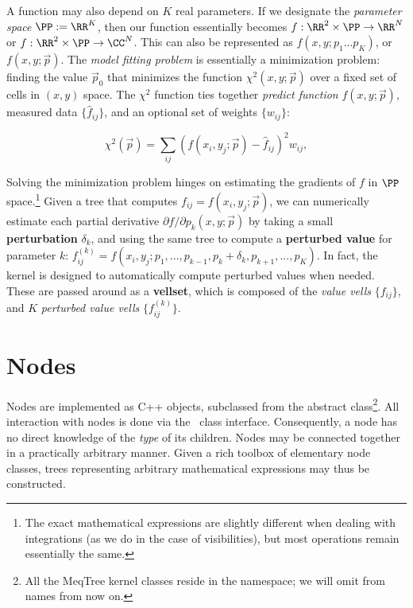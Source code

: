   A function may also depend on $K$ real parameters. If we designate the {\em
  parameter space} $\PP:=\RR^K$, then our function essentially becomes
  $f:\RR^2\times\PP\rightarrow\RR^N$ or $f:\RR^2\times\PP\rightarrow\CC^N$.
  This can also be represented as $f(x,y;p_1...p_K)$, or $f(x,y;\vec{p})$. The
  {\em model fitting problem} is essentially a minimization problem: finding
  the value $\vec{p}_0$  that minimizes the function $\chi^2(x,y;\vec{p})$ over
  a fixed set of cells in $(x,y)$ space. The $\chi^2$ function  ties together
  {\em predict function} $f(x,y;\vec{p})$, measured data $\{\hat{f}_{ij}\}$, and
  an optional set of weights $\{w_{ij}\}$:

  $$ \chi^2(\vec{p}) = \sum_{ij} (f(x_i,y_j;\vec{p}) - \hat{f}_{ij})^2w_{ij},$$
  
  Solving the minimization problem hinges on estimating the gradients of $f$ in
  $\PP$ space.\footnote{The exact mathematical expressions are slightly
  different when dealing with integrations (as we do in the case of
  visibilities), but most operations remain essentially the same.} Given a tree
  that computes $f_{ij}=f(x_i,y_j;\vec{p})$, we can numerically estimate each
  partial derivative ${\partial f}/{\partial p_k}(x,y;\vec{p})$ by taking a
  small {\bf perturbation} $\delta_k$, and using the same tree to compute a
  {\bf perturbed value} for parameter $k$: $f^{(k)}_{ij} =
  f(x_i,y_j;p_1,...,p_{k-1},p_k+\delta_k,p_{k+1},...,p_{K})$. In fact, the
  kernel is designed to automatically compute perturbed values when needed.
  These are passed around as a {\bf vellset}, which is composed of the {\em
  value vells} $\{f_{ij}\}$, and $K$ {\em perturbed value vells}
  $\{f^{(k)}_{ij}\}$.


\section{Nodes}

  Nodes are implemented as C++ objects, subclassed from the abstract
   class\footnote{All the MeqTree kernel classes reside in the
   namespace; we will omit  from names from now on.}. All
  interaction with nodes is done via the \Node\ class interface. Consequently, a
  node has no direct knowledge of the {\em type} of its children. Nodes may be
  connected together in a practically arbitrary manner. Given a rich toolbox of
  elementary node classes, trees representing arbitrary mathematical expressions
  may thus be constructed. 

